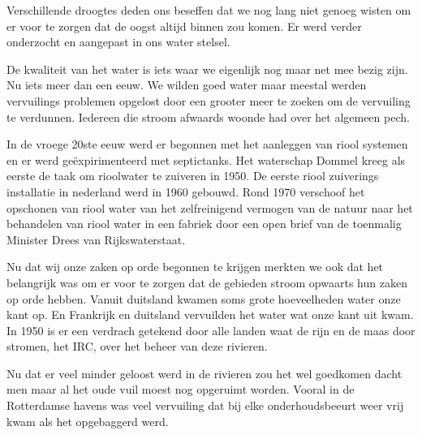 Verschillende droogtes deden ons beseffen dat we nog lang niet genoeg wisten om er voor te zorgen dat de oogst altijd binnen zou komen.
Er werd verder onderzocht en aangepast in ons water stelsel.

De kwaliteit van het water is iets waar we eigenlijk nog maar net mee bezig zijn.
Nu iets meer dan een eeuw.
We wilden goed water maar meestal werden vervuilings problemen opgelost door een grooter meer te zoeken om de vervuiling te verdunnen.
Iedereen die stroom afwaards woonde had over het algemeen pech.

In de vroege 20ste eeuw werd er begonnen met het aanleggen van riool systemen en er werd ge\"expirimenteerd met septictanks.
Het waterschap Dommel kreeg als eerste de taak om rioolwater te zuiveren in 1950.
De eerste riool zuiverings installatie in nederland werd in 1960 gebouwd.
Rond 1970 verschoof het opschonen van riool water van het zelfreinigend vermogen van de natuur naar het behandelen van riool water in een fabriek door een open brief van de toenmalig Minister Drees van Rijkswaterstaat.

Nu dat wij onze zaken op orde begonnen te krijgen merkten we ook dat het belangrijk was om er voor te zorgen dat de gebieden stroom opwaarts hun zaken op orde hebben.
Vanuit duitsland kwamen soms grote hoeveelheden water onze kant op.
En Frankrijk en duitsland vervuilden het water wat onze kant uit kwam.
In 1950 is er een verdrach getekend door alle landen waat de rijn en de maas door stromen, het IRC, over het beheer van deze rivieren.

Nu dat er veel minder geloost werd in de rivieren zou het wel goedkomen dacht men maar al het oude vuil moest nog opgeruimt worden. 
Vooral in de Rotterdamse havens was veel vervuiling dat bij elke onderhoudsbeeurt weer vrij kwam als het opgebaggerd werd.


